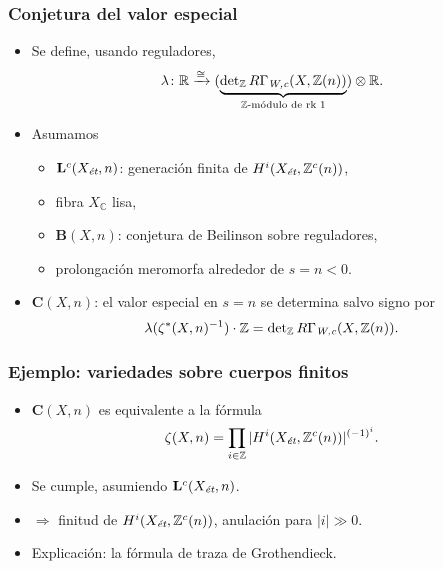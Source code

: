 \documentclass[handout]{beamer}
\newcommand{\CC}{\mathbb{C}}
\newcommand{\RR}{\mathbb{R}}
\newcommand{\ZZ}{\mathbb{Z}}
\newcommand{\et}{\text{\it ét}}
\newcommand{\Wc}{\text{\it W,c}}
\begin{document}
\begin{frame}
  \frametitle{Conjetura del valor especial}

  \begin{itemize}
  \item<2-> Se define, usando reguladores,
  \[ \lambda\colon \RR \xrightarrow{\cong}
    (\underbrace{\det\nolimits_\ZZ R\Gamma_\Wc (X, \ZZ (n))}_{\ZZ\text{-módulo de rk }1}) \otimes \RR. \]

  \item<3-> Asumamos
    \begin{itemize}
    \item $\mathbf{L}^c (X_\et, n)$: generación finita de $H^i (X_\et, \ZZ^c(n))$,
    \item fibra $X_\CC$ lisa,
    \item $\mathbf{B} (X,n)$: conjetura de Beilinson sobre reguladores,
    \item prolongación meromorfa alrededor de $s = n < 0$.
    \end{itemize}

  \item<4-> $\mathbf{C} (X,n)$: el valor especial en $s = n$ se determina salvo
    signo por
    \[ \lambda (\zeta^* (X,n)^{-1})\cdot \ZZ =
      \det\nolimits_\ZZ R\Gamma_\Wc (X, \ZZ (n)). \]
  \end{itemize}
\end{frame}


\begin{frame}
  \frametitle{Ejemplo: variedades sobre cuerpos finitos}

  \begin{itemize}
  \item<2-> $\mathbf{C} (X,n)$ es equivalente a la fórmula
    \[ \zeta (X,n) = \prod_{i \in \ZZ} |H^i (X_\et, \ZZ^c (n))|^{(-1)^i}. \]

  \item<3-> Se cumple, asumiendo $\mathbf{L}^c (X_\et, n)$.

  \item<4-> $\Longrightarrow$
    finitud de $H^i (X_\et, \ZZ^c (n))$,
    anulación para $|i| \gg 0$.

  \item<5-> Explicación: la fórmula de traza de Grothendieck.
  \end{itemize}
\end{frame}
\end{document}
